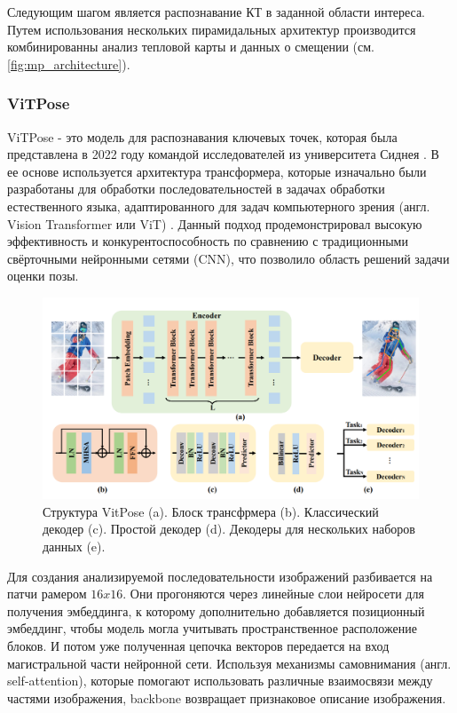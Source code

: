 Следующим шагом является распознавание КТ в заданной области интереса. Путем использования нескольких пирамидальных архитектур производится комбинированны анализ тепловой карты и данных о смещении (см. \autoref{fig:mp_architecture}).

\subsubsection*{ViTPose}

ViTPose - это модель для распознавания ключевых точек, которая была представлена в 2022 году командой исследователей из университета Сиднея \cite{vitpose}. В ее основе используется архитектура трансформера, которые изначально были разработаны для обработки последовательностей в задачах обработки естественного языка, адаптированного для задач компьютерного зрения (англ. Vision Transformer или ViT) \cite{vit}. Данный подход продемонстрировал высокую эффективность и конкурентоспособность по сравнению с традиционными свёрточными нейронными сетями (CNN), что позволило область решений задачи оценки позы.

\begin{figure}[h]
	\centering
	\includegraphics[width=.9\textwidth]{./images/vitpose_structure}
	\caption{Структура VitPose (a). Блоск трансфрмера (b). Классический декодер (c). Простой декодер (d). Декодеры для нескольких наборов данных (e). \cite{vitpose}}
	\label{fig:vitpose_structure}
\end{figure}

Для создания анализируемой последовательности изображений разбивается на патчи рамером $16x16$. Они прогоняются через линейные слои нейросети для получения эмбеддинга, к которому дополнительно добавляется позиционный эмбеддинг, чтобы модель могла учитывать пространственное расположение блоков. И потом уже полученная цепочка векторов передается на вход магистральной части нейронной сети. Используя механизмы самовнимания (англ. self-attention), которые помогают использовать различные взаимосвязи между частями изображения, backbone возвращает признаковое описание изображения.

